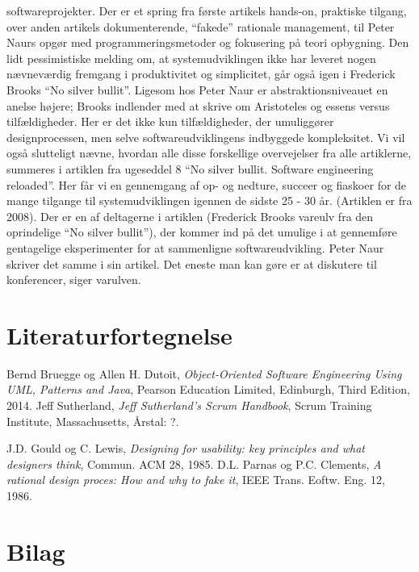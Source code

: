 \documentclass[12pt]{article}   %
\begin{document}
softwareprojekter. Der er et spring fra første artikels hands-on, praktiske
tilgang, over anden artikels dokumenterende, ``fakede'' rationale management,
til Peter Naurs opgør med programmeringsmetoder og fokusering på teori
opbygning. 
Den lidt pessimistiske melding om, at systemudviklingen ikke har
leveret nogen nævneværdig fremgang i produktivitet og simplicitet, går også igen
i Frederick Brooks ``No silver bullit''.
Ligesom hos Peter Naur er abstraktionsniveauet en anelse højere; Brooks
indlender med at skrive om Aristoteles og essens versus tilfældigheder. Her er 
det ikke kun tilfældigheder, der umuliggører designprocessen, men selve
softwareudviklingens indbyggede kompleksitet. Vi vil også slutteligt nævne,
hvordan alle disse forskellige overvejelser fra alle artiklerne, summeres i
artiklen fra ugeseddel 8 ``No silver bullit. Software engineering reloaded''.
Her får vi en gennemgang af op-
og nedture, succeer og fiaskoer for de mange tilgange til systemudviklingen
igennen de sidste 25 - 30 år. (Artiklen er fra 2008). Der er en af deltagerne
i artiklen (Frederick Brooks vareulv fra den oprindelige ``No silver bullit''), 
der kommer ind på det umulige i at gennemføre gentagelige eksperimenter for at
sammenligne softwareudvikling. Peter Naur skriver det samme i sin artikel.
Det eneste man kan gøre er at diskutere til konferencer, siger varulven. 




\pagebreak

\section{Literaturfortegnelse}
\begin{thebibliography}{9}
		Bernd Bruegge og Allen H. Dutoit,
		\emph{Object-Oriented Software Engineering Using UML, Patterns
		and Java},
		Pearson Education Limited, Edinburgh,
		Third Edition,
		2014.
		Jeff Sutherland,
		\emph{Jeff Sutherland's Scrum Handbook},
		Scrum Training Institute, Massachusetts,
		Årstal: ?.

		J.D. Gould og C. Lewis, 
	\emph{Designing for usability: key principles and what designers
	think},
	Commun. ACM 28,
	1985.
	D.L. Parnas og P.C. Clements,
	\emph{A rational design proces: How and why to fake it},
	IEEE Trans. Eoftw. Eng. 12,
	1986.
\end{thebibliography}


\section{Bilag}
\end{document}
